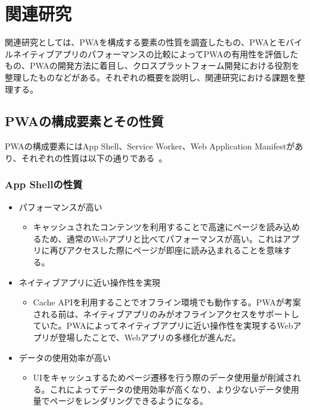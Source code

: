 \section{関連研究}
\label{section:関連研究}
関連研究としては、PWAを構成する要素の性質を調査したもの、PWAとモバイルネイティブアプリのパフォーマンスの比較によってPWAの有用性を評価したもの、PWAの開発方法に着目し、クロスプラットフォーム開発における役割を整理したものなどがある。それぞれの概要を説明し、関連研究における課題を整理する。
\subsection{PWAの構成要素とその性質}
\label{subsection:PWAの構成要素とその性質}
PWAの構成要素にはApp Shell、Service Worker、Web Application Manifestがあり、それぞれの性質は以下の通りである~\cite{Tandel2018ProgressiveWebApps}。
\subsubsection{App Shellの性質}\label{subsubsection:App Shellの性質}
\begin{itemize}
    \item パフォーマンスが高い
    \begin{itemize}
      \item キャッシュされたコンテンツを利用することで高速にページを読み込めるため、通常のWebアプリと比べてパフォーマンスが高い。これはアプリに再びアクセスした際にページが即座に読み込まれることを意味する。
    \end{itemize}
    \item ネイティブアプリに近い操作性を実現
    \begin{itemize}
        \item Cache APIを利用することでオフライン環境でも動作する。PWAが考案される前は、ネイティブアプリのみがオフラインアクセスをサポートしていた。PWAによってネイティブアプリに近い操作性を実現するWebアプリが登場したことで、Webアプリの多様化が進んだ。
    \end{itemize}
    \item データの使用効率が高い
    \begin{itemize}
        \item UIをキャッシュするためページ遷移を行う際のデータ使用量が削減される。これによってデータの使用効率が高くなり、より少ないデータ使用量でページをレンダリングできるようになる。
    \end{itemize}
\end{itemize}
